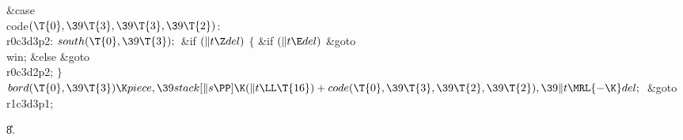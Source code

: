 \&{case} \\{code}${}(\T{0},\39\T{3},\39\T{3},\39\T{2}){}$:\5
\\{r0c3d3p2}:\5
${}\\{south}(\T{0},\39\T{3});{}$\6
\&{if} ${}(\|t\Z\\{del}){}$\5
${}\{{}$\5
\1\&{if} ${}(\|t\E\\{del}){}$\1\5
\&{goto} \\{win};\5
\2\&{else}\1\5
\&{goto} \\{r0c3d2p2};\5
\2${}\}{}$\2\6
${}\\{bord}(\T{0},\39\T{3})\K\\{piece},\39\\{stack}[\|s\PP]\K(\|t\LL\T{16})+%
\\{code}(\T{0},\39\T{3},\39\T{2},\39\T{2}),\39\|t\MRL{-{\K}}\\{del};{}$\6
\&{goto} \\{r1c3d3p1};\par
\U8.\fi

